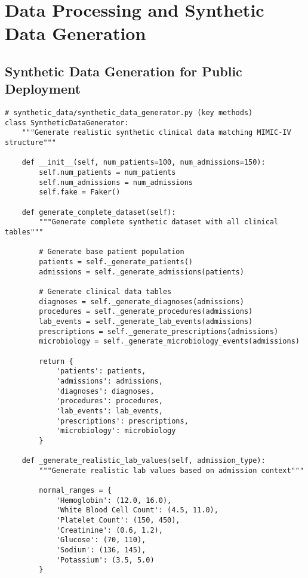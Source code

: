 \section{Data Processing and Synthetic Data Generation}

\subsection{Synthetic Data Generation for Public Deployment}

\begin{verbatim}
# synthetic_data/synthetic_data_generator.py (key methods)
class SyntheticDataGenerator:
    """Generate realistic synthetic clinical data matching MIMIC-IV structure"""
    
    def __init__(self, num_patients=100, num_admissions=150):
        self.num_patients = num_patients
        self.num_admissions = num_admissions
        self.fake = Faker()
        
    def generate_complete_dataset(self):
        """Generate complete synthetic dataset with all clinical tables"""
        
        # Generate base patient population
        patients = self._generate_patients()
        admissions = self._generate_admissions(patients)
        
        # Generate clinical data tables
        diagnoses = self._generate_diagnoses(admissions)
        procedures = self._generate_procedures(admissions)
        lab_events = self._generate_lab_events(admissions)
        prescriptions = self._generate_prescriptions(admissions)
        microbiology = self._generate_microbiology_events(admissions)
        
        return {
            'patients': patients,
            'admissions': admissions,
            'diagnoses': diagnoses,
            'procedures': procedures,
            'lab_events': lab_events,
            'prescriptions': prescriptions,
            'microbiology': microbiology
        }
    
    def _generate_realistic_lab_values(self, admission_type):
        """Generate realistic lab values based on admission context"""
        
        normal_ranges = {
            'Hemoglobin': (12.0, 16.0),
            'White Blood Cell Count': (4.5, 11.0),
            'Platelet Count': (150, 450),
            'Creatinine': (0.6, 1.2),
            'Glucose': (70, 110),
            'Sodium': (136, 145),
            'Potassium': (3.5, 5.0)
        }
        

\end{verbatim}
